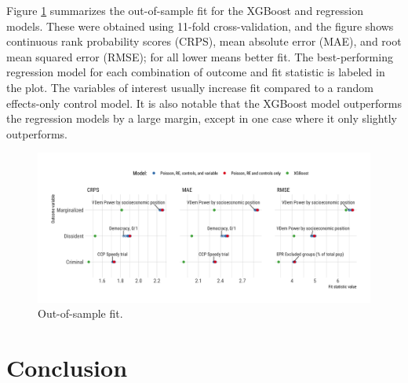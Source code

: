 \documentclass[11pt]{article}
\begin{document}

Figure \ref{oos-fit} summarizes the out-of-sample fit for the XGBoost and regression models. These were obtained using 11-fold cross-validation, and the figure shows continuous rank probability scores (CRPS), mean absolute error (MAE), and root mean squared error (RMSE); for all lower means better fit. The best-performing regression model for each combination of outcome and fit statistic is labeled in the plot. The variables of interest usually increase fit compared to a random effects-only control model. It is also notable that the XGBoost model outperforms the regression models by a large margin, except in one case where it only slightly outperforms. 

\begin{figure}
\begin{center}
\caption{Out-of-sample fit.}
\label{oos-fit}
\includegraphics[width=.99\textwidth]{../output/figures/oos-fit-all.png}
\end{center}
\end{figure}

\section*{Conclusion}
\end{document}
